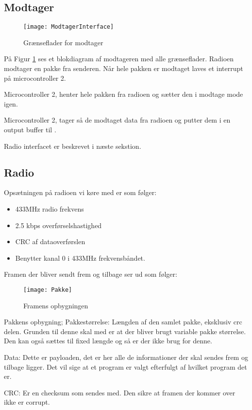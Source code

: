 \documentclass[Main]{subfiles}
\begin{document}
\subsection{Modtager}

\begin{figure}[H]
\centering
\texttt{[image: ModtagerInterface]}
\caption{Grænseflader for modtager}
\label{fig: ModtagerInterface}
\end{figure}
På Figur \ref{fig: ModtagerInterface} ses et blokdiagram af modtageren med alle grænseflader.
Radioen modtager en pakke fra senderen. Når hele pakken er modtaget laves et interrupt på microcontroller 2.

Microcontroller 2, henter hele pakken fra radioen og sætter den i modtage mode igen. 

Microcontroller 2, tager så de modtaget data fra radioen og putter dem i en output buffer til \itoc.

Radio interfacet er beskrevet i næste sekstion.


\subsection{Radio}
Opsætningen på radioen vi køre med er som følger:
\begin{itemize}
\item 433MHz radio frekvens
\item 2.5 kbps overførselshastighed
\item CRC af dataoverførslen
\item Benytter kanal 0 i 433MHz frekvensbåndet.
\end{itemize}


Framen der bliver sendt frem og tilbage ser ud som følger:
\begin{figure}[H]
\centering
\texttt{[image: Pakke]}
\caption{Framens opbygningen}
\label{fig: Pakke}
\end{figure}

Pakkens opbygning;
Pakkestørrelse: Længden af den samlet pakke, eksklusiv crc delen. Grunden til denne skal med er at der bliver brugt variable pakke størrelse. Den kan også sættes til fixed længde og så er der ikke brug for denne.

Data: Dette er payloaden, det er her alle de informationer der skal sendes frem og tilbage ligger. Det vil sige at et program er valgt efterfulgt af hvilket program det er.

CRC: Er en checksum som sendes med. Den sikre at framen der kommer over ikke er corrupt.
\end{document}
